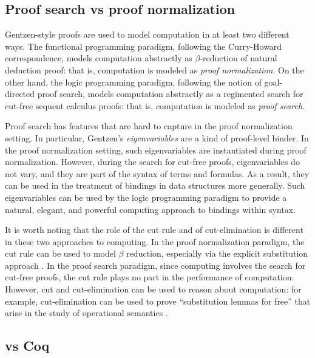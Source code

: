 \subsection{Proof search vs proof normalization}

Gentzen-style proofs are used to model computation in at least two
different ways.  The functional programming paradigm, following the
Curry-Howard correspondence, models computation abstractly as
$\beta$-reduction of natural deduction proof: that is, computation is
modeled as \emph{proof normalization}.  On the other hand, the logic
programming paradigm, following the notion of goal-directed proof
search, models computation abstractly as a regimented search for
cut-free sequent calculus proofs: that is, computation is modeled as
\emph{proof search}.

Proof search has features that are hard to capture in the proof
normalization setting.  In particular, Gentzen's \emph{eigenvariables}
are a kind of proof-level binder.  In the proof normalization setting,
such eigenvariables are instantiated during proof normalization.
However, during the search for cut-free proofs, eigenvariables do not
vary, and they are part of the syntax of terms and formulas.  As a
result, they can be used in the treatment of bindings in data
structures more generally.  Such eigenvariables can be used by the
logic programming paradigm to provide a natural, elegant, and powerful
computing approach to bindings within syntax.

It is worth noting that the role of the cut rule and of
cut-elimination is different in these two approaches to computing.
In the proof normalization paradigm, the cut rule can be used to model
$\beta$ reduction, especially via the explicit substitution approach
\cite{lengrand06phd}. In the proof search paradigm, since computing involves
the search for cut-free proofs, the cut rule plays no part in the
performance of computation.  However, cut and cut-elimination can be
used to reason about computation: for example, cut-elimination can be
used to prove ``substitution lemmas for free'' that arise in the study
of operational semantics \cite{gacek12jar}.

\subsection{\lP vs Coq}

